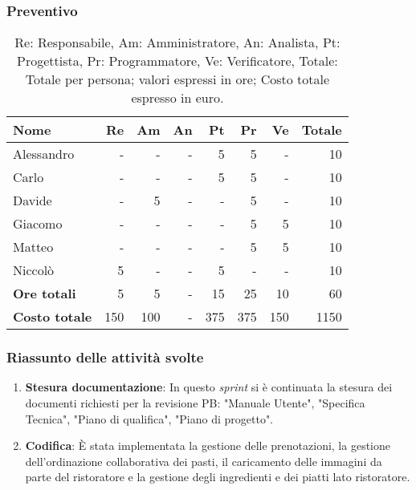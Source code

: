 \subsubsection{Preventivo}

\begin{table}[H]
	\centering
	\begin{tabular}{l|r|r|r|r|r|r|r}
		\textbf{Nome}         & \textbf{Re} & \textbf{Am} & \textbf{An} & \textbf{Pt} & \textbf{Pr} & \textbf{Ve} & \textbf{Totale} \\
		\hline
		Alessandro            & -           & -           & -           & 5           & 5           & -           & 10              \\
		Carlo                 & -           & -           & -           & 5           & 5           & -           & 10              \\
		Davide                & -           & 5           & -           & -           & 5           & -           & 10              \\
		Giacomo               & -           & -           & -           & -           & 5          	& 5           & 10              \\
		Matteo                & -           & -           & -           & -           & 5           & 5           & 10              \\
		Niccolò               & 5           & -           & -           & 5           & -           & -           & 10              \\
		\hline
		\textbf{Ore totali}   & 5           & 5           & -           & 15          & 25          & 10          & 60              \\
		\textbf{Costo totale} & 150         & 100         & -           & 375         & 375         & 150         & 1150
	\end{tabular}
	\caption{Re: Responsabile, Am: Amministratore, An: Analista, Pt: Progettista,
		Pr: Programmatore, Ve: Verificatore, Totale: Totale per persona; valori espressi in ore; Costo totale espresso in euro.}
\end{table}

\subsubsection{Riassunto delle attività svolte}

\begin{enumerate}
	\item \textbf{Stesura documentazione}: In questo \textit{sprint} si è continuata la stesura dei documenti richiesti per la revisione PB: "Manuale Utente", "Specifica Tecnica", "Piano di qualifica", "Piano di progetto".

	\item \textbf{Codifica}: È stata implementata la gestione delle prenotazioni, la gestione dell'ordinazione collaborativa dei pasti, il caricamento delle immagini da parte del ristoratore e la gestione degli ingredienti e dei piatti lato ristoratore.
\end{enumerate}

